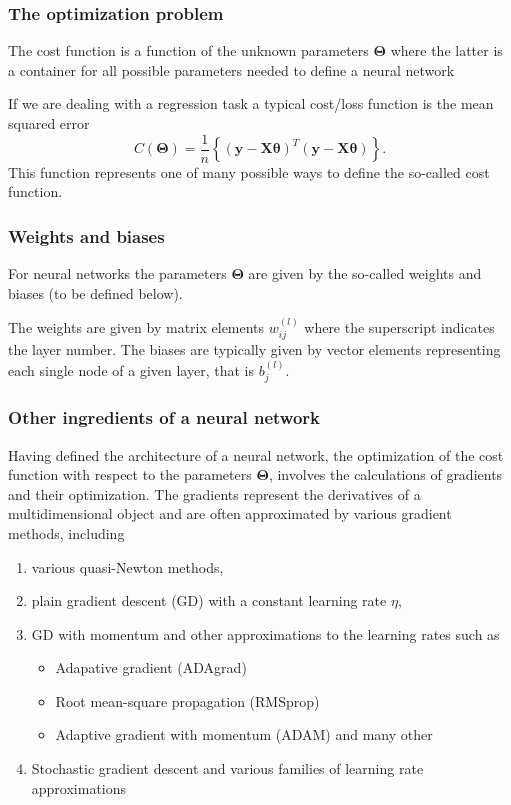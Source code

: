 \documentclass{beamer}
\begin{document}
\begin{frame}
\frametitle{The optimization problem}

The cost function is a function of the unknown parameters
$\bm{\Theta}$ where the latter is a container for all possible
parameters needed to define a neural network

If we are dealing with a regression task a typical cost/loss function
is the mean squared error
\[
C(\bm{\Theta})=\frac{1}{n}\left\{\left(\bm{y}-\bm{X}\bm{\theta}\right)^T\left(\bm{y}-\bm{X}\bm{\theta}\right)\right\}.
\]
This function represents one of many possible ways to define
the so-called cost function.
\end{frame}

\begin{frame}
\frametitle{Weights and biases}

For neural networks the parameters
$\bm{\Theta}$ are given by the so-called weights and biases (to be
defined below).

The weights are given by matrix elements $w_{ij}^{(l)}$ where the
superscript indicates the layer number. The biases are typically given
by vector elements representing each single node of a given layer,
that is $b_j^{(l)}$.
\end{frame}

\begin{frame}
\frametitle{Other ingredients of a neural network}

Having defined the architecture of a neural network, the optimization
of the cost function with respect to the parameters $\bm{\Theta}$,
involves the calculations of gradients and their optimization. The
gradients represent the derivatives of a multidimensional object and
are often approximated by various gradient methods, including
\begin{enumerate}
\item various quasi-Newton methods,

\item plain gradient descent (GD) with a constant learning rate $\eta$,

\item GD with momentum and other approximations to the learning rates such as
\begin{itemize}

  \item Adapative gradient (ADAgrad)

  \item Root mean-square propagation (RMSprop)

  \item Adaptive gradient with momentum (ADAM) and many other

\end{itemize}

\noindent
\item Stochastic gradient descent and various families of learning rate approximations
\end{enumerate}

\noindent
\end{frame}
\end{document}
